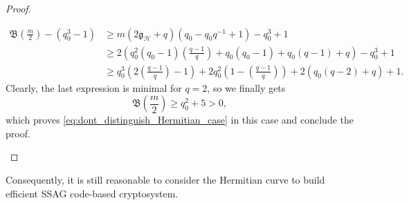\documentclass[a4paper]{article}
\theoremstyle{definition}
\theoremstyle{remark}
\newcommand{\calH}{\mathcal{H}}
\begin{document}
\begin{proof}
\begin{itemize}
\begin{align*}
           \mathfrak{B}\left(\frac{m}{2}\right) - (q_0^3-1) 
           &\geq m(2\mathfrak{g}_{\calH}+q)(q_0-q_0q^{-1}+1)-q_0^3+1 \\ 
           &\geq 2\left(q_0^2(q_0-1)\left(\frac{q-1}{q}\right)+q_0(q_0-1)+q_0(q-1)+q\right)-q_0^3+1 \\
           & \geq q_0^3\left(2\left(\frac{q-1}{q}\right)-1\right) + 2q_0^2\left(1-\left(\frac{q-1}{q}\right)\right) + 2(q_0(q-2)+q)+1.
        \end{align*}
        Clearly, the last expression is minimal for $q=2$, so we finally gets
        $$\mathfrak{B}\left(\frac{m}{2}\right) \geq q_0^2 + 5 >0,$$
        which proves \eqref{eq:dont_distinguish_Hermitian_case} in this case and conclude the proof.
    \end{itemize}
\end{proof}
Consequently, it is still reasonable to consider the Hermitian curve to build efficient SSAG code-based cryptosystem.


\clearpage


\end{document}
